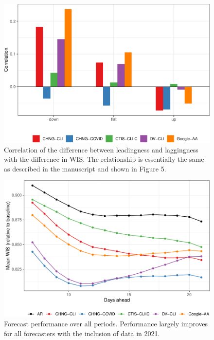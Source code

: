 \clearpage

\begin{figure}

{\centering \includegraphics[width=\textwidth]{fig/diff-in-lead-lag-1} 

}

\caption{Correlation of the difference between leadingness and laggingness with the difference in WIS. The relationship is essentially the same as described in the manuscript and shown in Figure 5.}\label{fig:diff-in-lead-lag}
\end{figure}

\clearpage

\begin{figure}

{\centering \includegraphics[width=\textwidth]{fig/fcast-alldates-1} 

}

\caption{Forecast performance over all periods. Performance largely improves for all forecasters with the inclusion of data in 2021.}\label{fig:fcast-alldates}
\end{figure}

